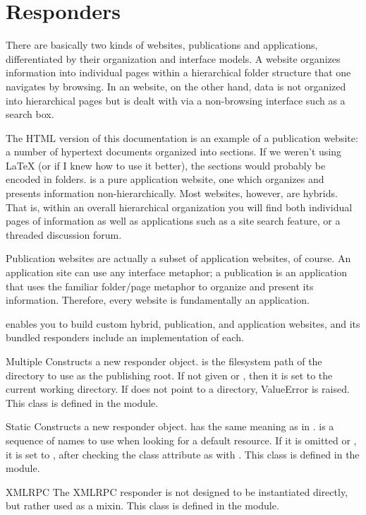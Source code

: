 \section{Responders \label{responders}}

There are basically two kinds of websites, publications and applications,
differentiated by their organization and interface models. A 
website organizes information into individual pages within a hierarchical folder
structure that one navigates by browsing. In an  website, on
the other hand, data is not organized into hierarchical pages but is dealt with
via a non-browsing interface such as a search box.

The HTML version of this documentation is an example of a publication website: a
number of hypertext documents organized into sections. If we weren't using LaTeX
(or if I knew how to use it better), the sections would probably be encoded in
folders.  is a pure application
website, one which organizes and presents information non-hierarchically. Most
websites, however, are hybrids. That is, within an overall hierarchical
organization you will find both individual pages of information as well as
applications such as a site search feature, or a threaded discussion forum.

Publication websites are actually a subset of application websites, of course.
An application site can use any interface metaphor; a publication is an
application that uses the familiar folder/page metaphor to organize and present
its information. Therefore, every website is fundamentally an application.

 enables you to build custom hybrid, publication, and application
websites, and its bundled responders include an implementation of each.



\begin{classdesc}{Multiple}{} Constructs a new 
responder object.  is the filesystem path of the directory to use as
the publishing root. If not given or , then it is set to the current
working directory. If  does not point to a directory, \exception
{ValueError} is raised. This class is defined in the
 module.\end{classdesc}

\begin{classdesc}{Static}{} Constructs a new  responder object.  has the
same meaning as in .  is a sequence of names to
use when looking for a default resource. If it is omitted or , it is
set to , after checking the class attribute as
with . This class is defined in the 
module.\end{classdesc}

\begin{classdesc*}{XMLRPC} The XMLRPC responder is not
designed to be instantiated directly, but rather used as a mixin. This class is
defined in the  module. \end{classdesc*}







